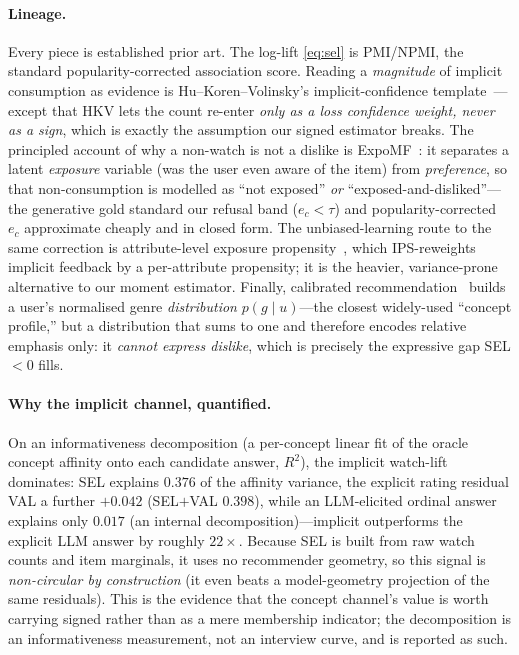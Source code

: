 \documentclass[11pt]{article}
\begin{document}
\paragraph{Lineage.} Every piece is established prior art. The log-lift
\eqref{eq:sel} is PMI/NPMI, the standard popularity-corrected association score. Reading a \emph{magnitude} of implicit
consumption as evidence is Hu--Koren--Volinsky's implicit-confidence template~\cite{hu2008collaborative}---except that
HKV lets the count re-enter \emph{only as a loss confidence weight, never as a sign}, which is exactly the assumption
our signed estimator breaks. The principled account of why a non-watch is not a dislike is
ExpoMF~\cite{liang2016expomf}: it separates a latent \emph{exposure} variable (was the user even aware of the item)
from \emph{preference}, so that non-consumption is modelled as ``not exposed'' \emph{or} ``exposed-and-disliked''---the
generative gold standard our refusal band ($e_c<\tau$) and popularity-corrected $e_c$ approximate cheaply and in closed
form. The unbiased-learning route to the same correction is attribute-level exposure
propensity~\cite{qin2020attributepropensity}, which IPS-reweights implicit feedback by a per-attribute propensity;
it is the heavier, variance-prone alternative to our moment estimator. Finally, calibrated
recommendation~\cite{steck2018calibrated} builds a user's normalised genre \emph{distribution} $p(g\mid u)$---the
closest widely-used ``concept profile,'' but a distribution that sums to one and therefore encodes relative emphasis
only: it \emph{cannot express dislike}, which is precisely the expressive gap SEL$<0$ fills.

\paragraph{Why the implicit channel, quantified.} On an informativeness decomposition (a per-concept linear fit of the
oracle concept affinity onto each candidate answer, $R^2$), the implicit watch-lift dominates: SEL explains $0.376$ of
the affinity variance, the explicit rating residual VAL a further $+0.042$ (SEL$+$VAL $0.398$), while an LLM-elicited
ordinal answer explains only $0.017$ (an internal decomposition)---implicit outperforms the explicit LLM answer by
roughly $22\times$.
Because SEL is built from raw watch counts and item marginals, it uses no recommender geometry, so this signal is
\emph{non-circular by construction} (it even beats a model-geometry projection of the same residuals). This is the
evidence that the concept channel's value is worth carrying signed rather than as a mere membership indicator; the
decomposition is an informativeness measurement, not an interview curve, and is reported as such.
\end{document}
